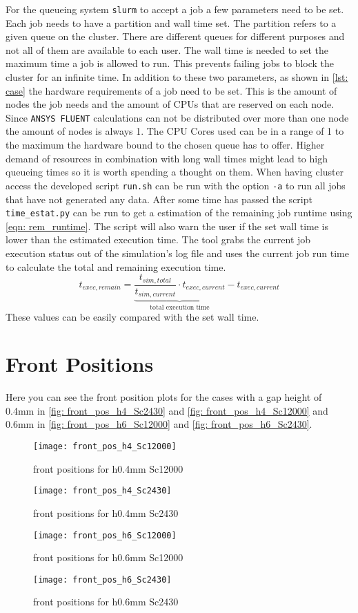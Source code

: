 \documentclass[../thesis.tex]{subfiles}
\begin{document}
For the queueing system \texttt{slurm} to accept a job a few parameters need to be set. Each job needs to have a partition and wall time set. The partition refers to a given queue on the cluster. There are different queues for different purposes and not all of them are available to each user.
The wall time is needed to set the maximum time a job is allowed to run. This prevents failing jobs to block the cluster for an infinite time. In addition to these two parameters, as shown in \autoref{lst: case} the hardware requirements of a job need to be set. This is the amount of nodes the job needs and the amount of CPUs that are reserved on each node. Since \texttt{ANSYS FLUENT} calculations can not be distributed over more than one node the amount of nodes is always 1. The CPU Cores used can be in a range of 1 to the maximum the hardware bound to the chosen queue has to offer. Higher demand of resources in combination with long wall times might lead to high queueing times so it is worth spending a thought on them. When having cluster access the developed script \texttt{run.sh} can be run with the option \texttt{-a} to run all jobs that have not generated any data. After some time has passed the script \texttt{time\_estat.py} can be run to get a estimation of the remaining job runtime using \autoref{eqn: rem_runtime}. The script will also warn the user if the set wall time is lower than the estimated execution time. The tool grabs the current job execution status out of the simulation's log file and uses the current job run time to calculate the total and remaining execution time. 
\begin{equation}
\label{eqn: rem_runtime}
t_{exec,remain} = \underbrace{\dfrac{t_{sim,total}}{t_{sim,current}} \cdot t_{exec,current}}_{\text{total execution time}}  - t_{exec,current} 
\end{equation}
These values can be easily compared with the set wall time.

\section{Front Positions}

Here you can see the front position plots for the cases with a gap height of 0.4mm in \autoref{fig: front_pos_h4_Sc2430} and \autoref{fig: front_pos_h4_Sc12000} and 0.6mm in \autoref{fig: front_pos_h6_Sc12000} and \autoref{fig: front_pos_h6_Sc2430}.

\begin{figure}[htbp]
	\centering
	\texttt{[image: front\_pos\_h4\_Sc12000]}
	\caption{front positions for h0.4mm Sc12000\label{fig: front_pos_h4_Sc12000}}\bigskip
	\texttt{[image: front\_pos\_h4\_Sc2430]}
	\caption{front positions for h0.4mm Sc2430\label{fig: front_pos_h4_Sc2430}}
\end{figure}

\begin{figure}[htbp]
	\centering
	\texttt{[image: front\_pos\_h6\_Sc12000]}
	\caption{front positions for h0.6mm Sc12000\label{fig: front_pos_h6_Sc12000}}\bigskip
	\texttt{[image: front\_pos\_h6\_Sc2430]}
	\caption{front positions for h0.6mm Sc2430\label{fig: front_pos_h6_Sc2430}}
\end{figure}
\end{document}
